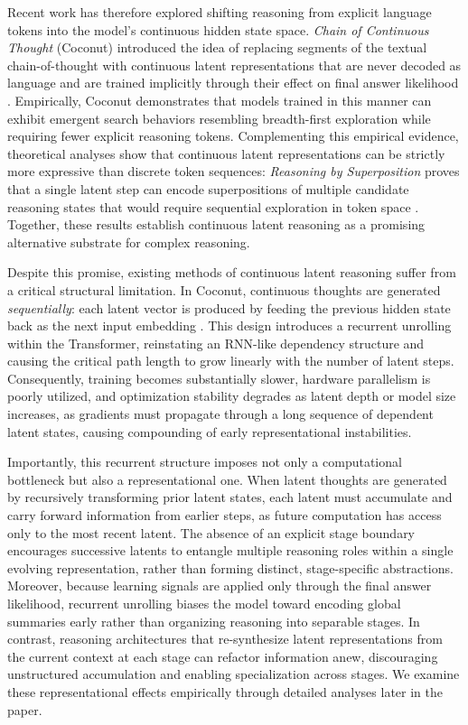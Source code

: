 Recent work has therefore explored shifting reasoning from explicit language tokens into the model’s continuous hidden state space. \emph{Chain of Continuous Thought} (Coconut) introduced the idea of replacing segments of the textual chain-of-thought with continuous latent representations that are never decoded as language and are trained implicitly through their effect on final answer likelihood \cite{hao2024training}. Empirically, Coconut demonstrates that models trained in this manner can exhibit emergent search behaviors resembling breadth-first exploration while requiring fewer explicit reasoning tokens. Complementing this empirical evidence, theoretical analyses show that continuous latent representations can be strictly more expressive than discrete token sequences: \emph{Reasoning by Superposition} proves that a single latent step can encode superpositions of multiple candidate reasoning states that would require sequential exploration in token space \cite{zhu2025reasoning}. Together, these results establish continuous latent reasoning as a promising alternative substrate for complex reasoning.

Despite this promise, existing methods of continuous latent reasoning suffer from a critical structural limitation. In Coconut, continuous thoughts are generated \emph{sequentially}: each latent vector is produced by feeding the previous hidden state back as the next input embedding \cite{hao2024training}. This design introduces a recurrent unrolling within the Transformer, reinstating an RNN-like dependency structure and causing the critical path length to grow linearly with the number of latent steps. Consequently, training becomes substantially slower, hardware parallelism is poorly utilized, and optimization stability degrades as latent depth or model size increases, as gradients must propagate through a long sequence of dependent latent states, causing compounding of early representational instabilities.

Importantly, this recurrent structure imposes not only a computational bottleneck but also a representational one. When latent thoughts are generated by recursively transforming prior latent states, each latent must accumulate and carry forward information from earlier steps, as future computation has access only to the most recent latent. The absence of an explicit stage boundary encourages successive latents to entangle multiple reasoning roles within a single evolving representation, rather than forming distinct, stage-specific abstractions. Moreover, because learning signals are applied only through the final answer likelihood, recurrent unrolling biases the model toward encoding global summaries early rather than organizing reasoning into separable stages. In contrast, reasoning architectures that re-synthesize latent representations from the current context at each stage can refactor information anew, discouraging unstructured accumulation and enabling specialization across stages. We examine these representational effects empirically through detailed analyses later in the paper.

